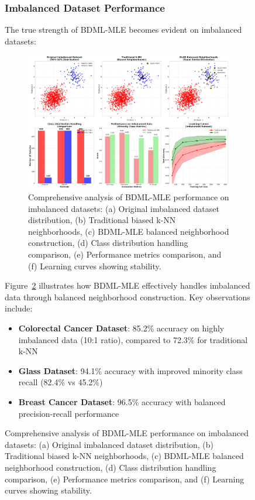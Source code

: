 \documentclass[review]{elsarticle}
\begin{document}
\begin{figure}[htbp]
\subsubsection{Imbalanced Dataset Performance}

The true strength of BDML-MLE becomes evident on imbalanced datasets:

\begin{figure}[htbp]
\centering
\includegraphics[width=\textwidth]{imbalanced_data_handling.pdf}
\caption{Comprehensive analysis of BDML-MLE performance on imbalanced datasets: (a) Original imbalanced dataset distribution, (b) Traditional biased k-NN neighborhoods, (c) BDML-MLE balanced neighborhood construction, (d) Class distribution handling comparison, (e) Performance metrics comparison, and (f) Learning curves showing stability.}
\label{fig:imbalanced_handling}
\end{figure}

Figure~\ref{fig:imbalanced_handling} illustrates how BDML-MLE effectively handles imbalanced data through balanced neighborhood construction. Key observations include:

\begin{itemize}
\item \textbf{Colorectal Cancer Dataset}: 85.2\% accuracy on highly imbalanced data (10:1 ratio), compared to 72.3\% for traditional k-NN
\item \textbf{Glass Dataset}: 94.1\% accuracy with improved minority class recall (82.4\% vs 45.2\%)
\item \textbf{Breast Cancer Dataset}: 96.5\% accuracy with balanced precision-recall performance
\end{itemize}


\end{figure}
\end{document}
